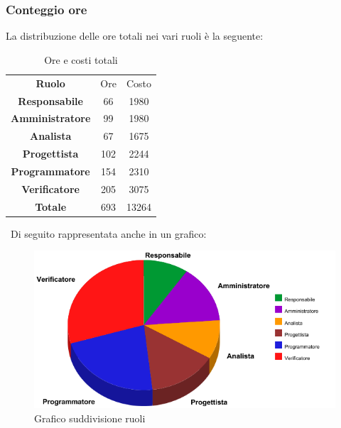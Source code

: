 	\subsubsection{Conteggio ore}
		La distribuzione delle ore totali nei vari ruoli è la seguente:
		
		\begin{table}[!htpb]
				\centering
			\renewcommand{\arraystretch}{1.8} 
			\begin{tabular}{| c c c|}
				\rowcolor{orange!50}
				\hline
				\multicolumn{3}{|c|}{\textbf{Suddivisione delle ore nei vari ruoli}}\\
				\hline
				\textbf{Ruolo} 			& Ore 	& Costo\\
				\hline
				\textbf{Responsabile}	&66 	&1980\\
				\hline
				\textbf{Amministratore}	&99 	&1980\\
				\hline
				\textbf{Analista}		&67 	&1675\\
				\hline
				\textbf{Progettista}	&102 	&2244\\
				\hline
				\textbf{Programmatore}	&154 	&2310\\
				\hline
				\textbf{Verificatore} 	&205 	&3075\\
				\hline
				\textbf{Totale} 		&693	&13264\\
				\hline 
			\end{tabular}
			\caption{Ore e costi totali }
		\end{table}
		~\newline Di seguito rappresentata anche in un grafico:
		\begin{figure}[!htpb]
			\centering
			\includegraphics[scale=0.8]{preventivo/torta_totali.png}
			\caption{Grafico suddivisione ruoli}
		\end{figure}
	\clearpage
